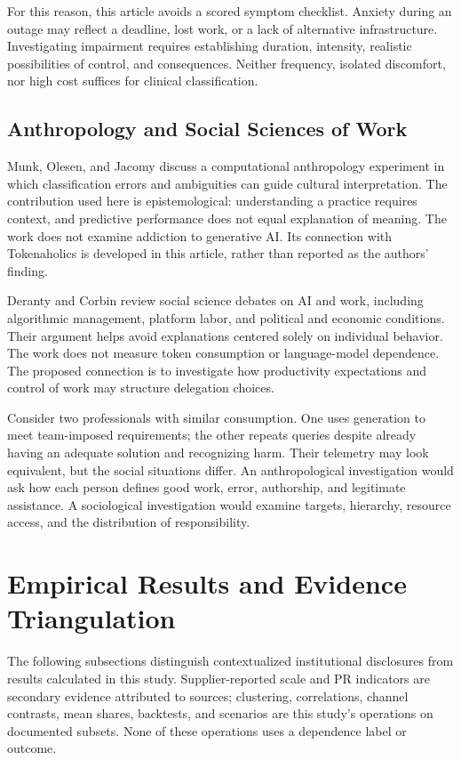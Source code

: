 \documentclass[11pt,a4paper]{article}
\begin{document}
For this reason, this article avoids a scored symptom checklist. Anxiety during an outage may reflect a deadline, lost work, or a lack of alternative infrastructure. Investigating impairment requires establishing duration, intensity, realistic possibilities of control, and consequences. Neither frequency, isolated discomfort, nor high cost suffices for clinical classification.

\subsection{Anthropology and Social Sciences of Work}
Munk, Olesen, and Jacomy \cite{munk} discuss a computational anthropology experiment in which classification errors and ambiguities can guide cultural interpretation. The contribution used here is epistemological: understanding a practice requires context, and predictive performance does not equal explanation of meaning. The work does not examine addiction to generative AI. Its connection with Tokenaholics is developed in this article, rather than reported as the authors' finding.

Deranty and Corbin \cite{sociologia} review social science debates on AI and work, including algorithmic management, platform labor, and political and economic conditions. Their argument helps avoid explanations centered solely on individual behavior. The work does not measure token consumption or language-model dependence. The proposed connection is to investigate how productivity expectations and control of work may structure delegation choices.

Consider two professionals with similar consumption. One uses generation to meet team-imposed requirements; the other repeats queries despite already having an adequate solution and recognizing harm. Their telemetry may look equivalent, but the social situations differ. An anthropological investigation would ask how each person defines good work, error, authorship, and legitimate assistance. A sociological investigation would examine targets, hierarchy, resource access, and the distribution of responsibility.

\section{Empirical Results and Evidence Triangulation}
The following subsections distinguish contextualized institutional disclosures from results calculated in this study. Supplier-reported scale and PR indicators are secondary evidence attributed to sources; clustering, correlations, channel contrasts, mean shares, backtests, and scenarios are this study's operations on documented subsets. None of these operations uses a dependence label or outcome.
\end{document}
